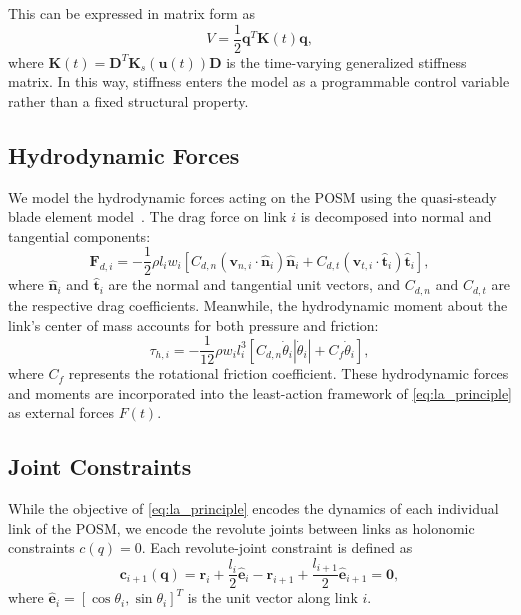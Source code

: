 This can be expressed in matrix form as
\begin{equation}
V = \frac{1}{2}\mathbf{q}^T\mathbf{K}(t)\mathbf{q},
\end{equation}
where $\mathbf{K}(t) = \mathbf{D}^T\mathbf{K}_s(\mathbf{u}(t))\mathbf{D}$ is the time-varying generalized stiffness matrix. In this way, stiffness enters the model as a programmable control variable rather than a fixed structural property.

\subsection{Hydrodynamic Forces}

We model the hydrodynamic forces acting on the POSM using the quasi-steady blade element model~\cite{najafi_numerical_2017}. The drag force on link $i$ is decomposed into normal and tangential components:
\begin{equation}
\mathbf{F}_{d,i} = -\frac{1}{2}\rho l_i w_i
\left[
C_{d,n}(\mathbf{v}_{n,i} \cdot \hat{\mathbf{n}}_i)\hat{\mathbf{n}}_i +
C_{d,t}(\mathbf{v}_{t,i} \cdot \hat{\mathbf{t}}_i)\hat{\mathbf{t}}_i
\right],
\end{equation}
where $\hat{\mathbf{n}}_i$ and $\hat{\mathbf{t}}_i$ are the normal and tangential unit vectors, and $C_{d,n}$ and $C_{d,t}$ are the respective drag coefficients. Meanwhile, the hydrodynamic moment about the link's center of mass accounts for both pressure and friction:
\begin{equation}
\tau_{h,i} = -\frac{1}{12}\rho w_i l_i^3
\left[
C_{d,n}\dot{\theta}_i|\dot{\theta}_i| + C_f\dot{\theta}_i
\right],
\end{equation}
where $C_f$ represents the rotational friction coefficient. These hydrodynamic forces and moments are incorporated into the least-action framework of \eqref{eq:la_principle} as external forces $F(t)$.

\subsection{Joint Constraints}

While the objective of \eqref{eq:la_principle} encodes the dynamics of each individual link of the POSM, we encode the revolute joints between links as holonomic constraints $c(q)=0$. Each revolute-joint constraint is defined as
\begin{equation}
\mathbf{c}_{i+1}(\mathbf{q}) =
\mathbf{r}_i + \frac{l_i}{2}\hat{\mathbf{e}}_i
- \mathbf{r}_{i+1} + \frac{l_{i+1}}{2}\hat{\mathbf{e}}_{i+1}
= \mathbf{0},
\label{eq:joint_constraint}
\end{equation}
where $\hat{\mathbf{e}}_i = [\cos\theta_i, \sin\theta_i]^T$ is the unit vector along link $i$.

